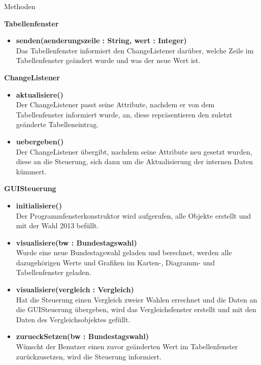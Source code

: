 \documentclass[12pt,a4paper,titlepage]{article}
\begin{document}
\begin{large}
Methoden 
\end{large}
\begin{description}
\item \textbf {Tabellenfenster} \\
\begin{itemize}
\item \textbf {senden(aenderungszeile : String, wert : Integer)} \\
Das Tabellenfenster informiert den ChangeListener darüber, welche Zeile im Tabellenfenster
geändert  wurde und was der neue Wert ist. \\
\end{itemize}
\item \textbf {ChangeListener} \\
\begin{itemize}
\item \textbf {aktualisiere()} \\
Der ChangeListener passt seine Attribute, nachdem er von dem Tabellenfenster informiert wurde, an,
diese repräsentieren den zuletzt geänderte Tabelleneintrag. \\
\item \textbf {uebergeben()} \\
Der ChangeListener übergibt, nachdem seine Attribute neu gesetzt wurden, diese an die Steuerung,
sich dann um die Aktualisierung der internen Daten kümmert. \\
\end{itemize} 
\item \textbf {GUISteuerung} \\
\begin{itemize}
\item \textbf {initialisiere()} \\
Der Programmfensterkonstruktor wird aufgerufen, alle Objekte erstellt und mit der Wahl 2013 befüllt. \\
\item \textbf {visualisiere(bw : Bundestagswahl)} \\
Wurde eine neue Bundestagswahl geladen und berechnet, werden alle dazugehörigen Werte und Grafiken
im Karten-, Diagramm- und Tabellenfenster geladen. \\ 
\item \textbf {visualisiere(vergleich : Vergleich)} \\
Hat die Steuerung einen Vergleich zweier Wahlen errechnet und die Daten an die GUISteuerung übergeben,
wird das Vergleichsfenster erstellt und mit den Daten des Vergleichsobjektes gefüllt. \\
\item \textbf {zurueckSetzen(bw : Bundestagswahl)} \\
Wünscht der Benutzer einen zuvor geänderten Wert im Tabellenfenster zurückzusetzen, wird die Steuerung 
informiert. \\
\end{itemize}

\end{description}
\newpage
\end{document}
